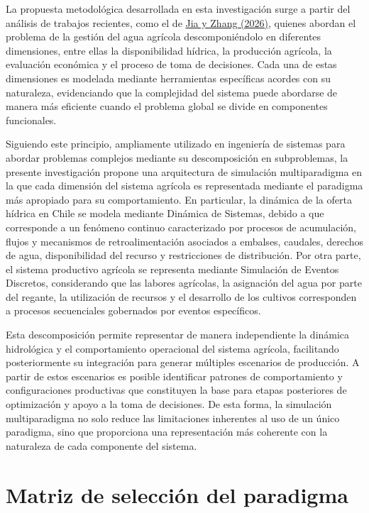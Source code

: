 \documentclass[12pt]{report}
\newcommand{\citeref}[2]{\hyperlink{ref:#1}{#2}}
\begin{document}
La propuesta metodológica desarrollada en esta investigación surge a partir del análisis de trabajos recientes, como el de \citeref{jia2026}{Jia y Zhang (2026)}, quienes abordan el problema de la gestión del agua agrícola descomponiéndolo en diferentes dimensiones, entre ellas la disponibilidad hídrica, la producción agrícola, la evaluación económica y el proceso de toma de decisiones. Cada una de estas dimensiones es modelada mediante herramientas específicas acordes con su naturaleza, evidenciando que la complejidad del sistema puede abordarse de manera más eficiente cuando el problema global se divide en componentes funcionales.

Siguiendo este principio, ampliamente utilizado en ingeniería de sistemas para abordar problemas complejos mediante su descomposición en subproblemas, la presente investigación propone una arquitectura de simulación multiparadigma en la que cada dimensión del sistema agrícola es representada mediante el paradigma más apropiado para su comportamiento. En particular, la dinámica de la oferta hídrica en Chile se modela mediante Dinámica de Sistemas, debido a que corresponde a un fenómeno continuo caracterizado por procesos de acumulación, flujos y mecanismos de retroalimentación asociados a embalses, caudales, derechos de agua, disponibilidad del recurso y restricciones de distribución. Por otra parte, el sistema productivo agrícola se representa mediante Simulación de Eventos Discretos, considerando que las labores agrícolas, la asignación del agua por parte del regante, la utilización de recursos y el desarrollo de los cultivos corresponden a procesos secuenciales gobernados por eventos específicos.

Esta descomposición permite representar de manera independiente la dinámica hidrológica y el comportamiento operacional del sistema agrícola, facilitando posteriormente su integración para generar múltiples escenarios de producción. A partir de estos escenarios es posible identificar patrones de comportamiento y configuraciones productivas que constituyen la base para etapas posteriores de optimización y apoyo a la toma de decisiones. De esta forma, la simulación multiparadigma no solo reduce las limitaciones inherentes al uso de un único paradigma, sino que proporciona una representación más coherente con la naturaleza de cada componente del sistema.

\section{Matriz de selección del paradigma}
\end{document}
